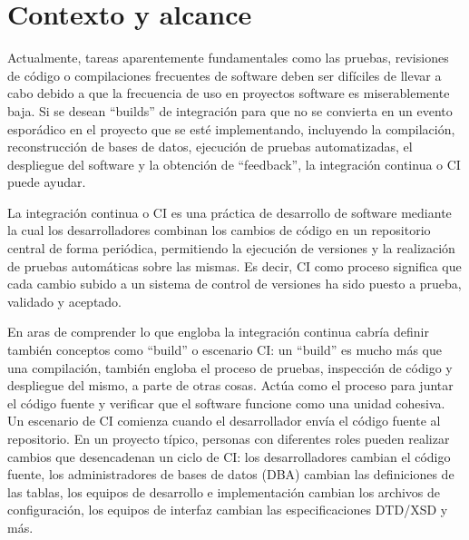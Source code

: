 \section{Contexto y alcance}

Actualmente, tareas aparentemente fundamentales como las pruebas, revisiones de código o compilaciones frecuentes de software deben ser difíciles de llevar a cabo debido a que la frecuencia de uso en proyectos software es miserablemente baja.
Si se desean ``builds'' de integración para que no se convierta en un evento esporádico en el proyecto que se esté implementando, incluyendo la compilación, reconstrucción de bases de datos, ejecución de pruebas automatizadas, el despliegue del software y la obtención de “feedback”, la integración continua o CI puede ayudar.

La integración continua o CI es una práctica de desarrollo de software mediante la cual los desarrolladores combinan los cambios de código en un repositorio central de forma periódica, permitiendo la ejecución de versiones y la realización de pruebas automáticas sobre las mismas. Es decir, CI como proceso significa que cada cambio subido a un sistema de control de versiones ha sido puesto a prueba, validado y aceptado.

En aras de comprender lo que engloba la integración continua cabría definir también conceptos como “build” o escenario CI: un “build” es mucho más que una compilación, también engloba el proceso de pruebas, inspección de código y despliegue del mismo, a parte de otras cosas. Actúa como el proceso para juntar el código fuente y verificar que el software funcione como una unidad cohesiva. Un escenario de CI comienza cuando el desarrollador envía el código fuente al repositorio. En un proyecto típico, personas con diferentes roles pueden realizar cambios que desencadenan un ciclo de CI: los desarrolladores cambian el código fuente, los administradores de bases de datos (DBA) cambian las definiciones de las tablas, los equipos de desarrollo e implementación cambian los archivos de configuración, los equipos de interfaz cambian las especificaciones DTD/XSD y más.


